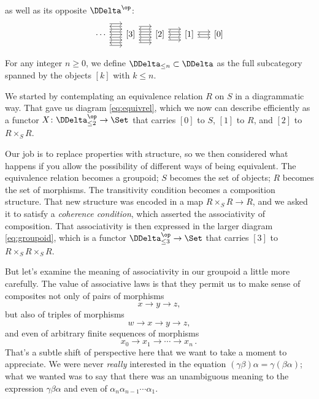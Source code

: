as well as its opposite $\DDelta^{\op}$:
\[
  \begin{tikzcd}[sep=1.5em, ampersand replacement=\&]
    \cdots \arrow[r] \arrow[r, shift left=1.5ex] \arrow[r, shift right=1.5ex] \arrow[r, shift left=3ex] \arrow[r, shift right=3ex] \&
    {[3]} \arrow[r, shift left=0.75ex] \arrow[r, shift right=0.75ex] \arrow[r, shift right=2.25ex] \arrow[r, shift left=2.25ex] \arrow[l, shift left=0.75ex] \arrow[l, shift right=0.75ex] \arrow[l, shift left=2.25ex] \arrow[l, shift right=2.25ex] \&
    {[2]} \arrow[l] \arrow[l, shift left=1.5ex] \arrow[l, shift right=1.5ex] \arrow[r] \arrow[r, shift left=1.5ex] \arrow[r, shift right=1.5ex] \&
    {[1]} \arrow[l, shift left=0.75ex] \arrow[l, shift right=0.75ex] \arrow[r, shift left=0.75ex] \arrow[r, shift right=0.75ex] \&
    {[0]} \arrow[l]
  \end{tikzcd}%
\]

\begin{notation}
  For any integer $n \geq 0$, we define $\DDelta_{\leq n} \subset \DDelta$ as the full subcategory spanned by the objects $[k]$ with $k \leq n$.
\end{notation}

We started by contemplating an equivalence relation $R$ on $S$ in a diagrammatic way.
That gave us diagram \eqref{eq:equivrel}, which we now can describe efficiently as a functor $X \colon \DDelta_{\leq 2}^{\op} \to \Set$ that carries $[0]$ to $S$, $[1]$ to $R$, and $[2]$ to $R \times_S R$.

Our job is to replace properties with structure, so
we then considered what happens if you allow the possibility of different ways of being equivalent.
The equivalence relation becomes a groupoid;
$S$ becomes the set of objects;
$R$ becomes the set of morphisms.
The transitivity condition becomes a composition structure.
That new structure was encoded in a map $R \times_S R \to R$,
and we asked it to satisfy a \emph{coherence condition}, which asserted the associativity of composition.
That associativity is then expressed in the larger diagram \eqref{eq:groupoid},
which is a functor $\DDelta_{\leq 3}^{\op} \to \Set$ that carries $[3]$ to $R \times_S R \times_S R$.

But let's examine the meaning of associativity in our groupoid a little more carefully.
The value of associative laws is that they permit us to make sense of composites not only of pairs of morphisms
\[
  x \to y \to z \comma
\]
but also of triples of morphisms
\[
  w \to x \to y \to z \comma
\]
and even of arbitrary finite sequences of morphisms
\[
  x_0 \to x_1 \to \cdots \to x_n \period
\]
That's a subtle shift of perspective here that we want to take a moment to appreciate.
We were never \emph{really} interested in the equation $(\gamma\beta)\alpha = \gamma(\beta\alpha)$;
what we wanted was to say that there was an unambiguous meaning to the expression $\gamma\beta\alpha$ and even of $\alpha_n \alpha_{n-1} \cdots \alpha_1$.

